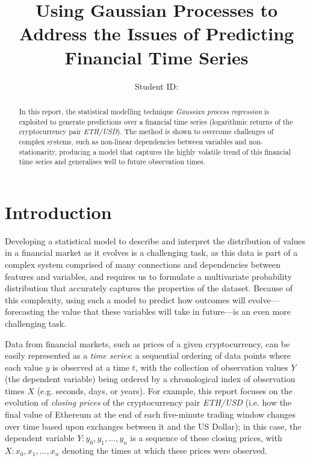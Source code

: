 \documentclass[a4paper, 11pt]{article}
\title{Using Gaussian Processes to Address the Issues of Predicting Financial Time Series}
\author{Student ID: }
\date{}
\begin{document}
    \maketitle

    \begin{abstract}
        In this report, the statistical modelling technique \emph{Gaussian process regression} is exploited to generate predictions over a financial time series (logarithmic returns of the cryptocurrency pair \emph{ETH/USD}). The method is shown to overcome challenges of complex systems, such as non-linear dependencies between variables and non-stationarity, producing a model that captures the highly volatile trend of this financial time series and generalises well to future observation times.   
    \end{abstract}

    \section{Introduction}

    Developing a statistical model to describe and interpret the distribution of values in a financial market as it evolves is a challenging task, as this data is part of a complex system comprised of many connections and dependencies between features and variables, and requires us to formulate a multivariate probability distribution that accurately captures the properties of the dataset. Because of this complexity, using such a model to predict how outcomes will evolve---forecasting the value that these variables will take in future---is an even more challenging task. 

    Data from financial markets, such as prices of a given cryptocurrency, can be easily represented as a \emph{time series}: a sequential ordering of data points where each value $y$ is observed at a time $t$, with the collection of observation values $Y$ (the dependent variable) being ordered by a chronological index of observation times $X$ (e.g. seconds, days, or years). For example, this report focuses on the evolution of \emph{closing prices} of the cryptocurrency pair \emph{ETH/USD} (i.e. how the final value of Ethereum at the end of each five-minute trading window changes over time based upon exchanges between it and the US Dollar); in this case, the dependent variable $Y \colon y_0, y_1, \ldots, y_n$ is a sequence of these closing prices, with $X \colon x_0, x_1, \ldots, x_n$ denoting the times at which these prices were observed.
\end{document}
